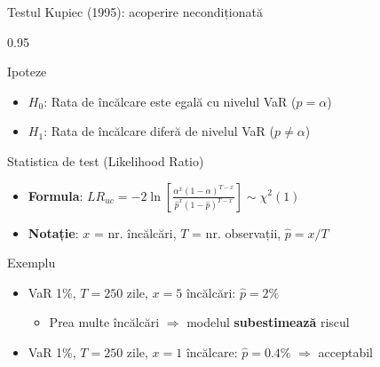 \documentclass[9pt, aspectratio=169, t]{beamer}
\begin{document}
\begin{frame}{Testul Kupiec (1995): acoperire necondiționată}
    \small
    \begin{cminipage}{0.95\textwidth}
        \begin{block}{Ipoteze}
            \begin{itemize}\setlength{\itemsep}{0pt}
                \item $H_0$: Rata de încălcare este egală cu nivelul VaR ($p = \alpha$)
                \item $H_1$: Rata de încălcare diferă de nivelul VaR ($p \neq \alpha$)
            \end{itemize}
        \end{block}
        \vspace{-0.1cm}
        \begin{block}{Statistica de test (Likelihood Ratio)}
            \begin{itemize}\setlength{\itemsep}{0pt}
                \item \textbf{Formula}:
                $LR_{uc} = -2 \ln \left[ \frac{\alpha^x (1-\alpha)^{T-x}}{\hat{p}^x (1-\hat{p})^{T-x}} \right] \sim \chi^2(1)$
                \item \textbf{Notație}: $x$ = nr. încălcări, $T$ = nr. observații, $\hat{p} = x/T$
            \end{itemize}
        \end{block}
        \vspace{-0.1cm}
        \begin{exampleblock}{Exemplu}
            \begin{itemize}\setlength{\itemsep}{0pt}
                \item VaR 1\%, $T = 250$ zile, $x = 5$ încălcări: $\hat{p} = 2\%$
                    \begin{itemize}\setlength{\itemsep}{0pt}
                        \item Prea multe încălcări $\Rightarrow$ modelul \textbf{subestimează} riscul
                    \end{itemize}
                \item VaR 1\%, $T = 250$ zile, $x = 1$ încălcare: $\hat{p} = 0.4\%$ $\Rightarrow$ acceptabil
            \end{itemize}
        \end{exampleblock}
    \end{cminipage}
\end{frame}
\end{document}
